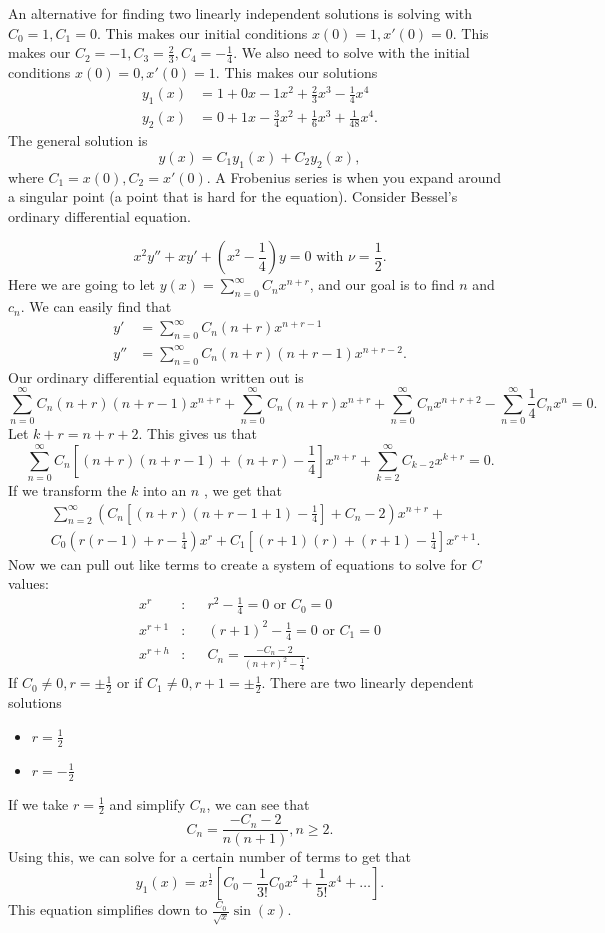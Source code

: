 An alternative for finding two linearly independent solutions is solving with $C_0=1,C_1=0$. This makes our initial conditions $x(0)=1,x'(0)=0$. This makes our $C_2=-1,C_3=\frac{2}{3},C_4=-\frac{1}{4}$. We also need to solve with the initial conditions $x(0)=0,x'(0)=1$. This makes our solutions 
\begin{align*}
  y_1(x)&=1+0x-1x^2+\frac{2}{3}x^3-\frac{1}{4}x^{4}\\
  y_2(x)&=0+1x-\frac{3}{4}x^2+\frac{1}{6}x^3+\frac{1}{48}x^{4}
.\end{align*}
The general solution is 
\[
  y(x)=C_1y_1(x)+C_2y_2(x)
,\] 
where $C_1=x(0),C_2=x'(0)$. A Frobenius series is when you expand around a singular point (a point that is hard for the equation). Consider Bessel's ordinary differential equation.
\begin{eg}
  \[
  x^2y''+xy'+\left( x^2-\frac{1}{4} \right) y=0\text{ with }\nu=\frac{1}{2}
  .\] 
  Here we are going to let $y(x)=\sum_{n=0}^{\infty} C_nx^{n+r}$, and our goal is to find $n$ and $c_n$. We can easily find that 
  \begin{align*}
    y'&=\sum_{n=0}^{\infty} C_n(n+r)x^{n+r-1}\\
    y''&=\sum_{n=0}^{\infty} C_n(n+r)(n+r-1)x^{n+r-2}
  .\end{align*}
  Our ordinary differential equation written out is 
  \[
    \sum_{n=0}^{\infty} C_n(n+r)(n+r-1)x^{n+r}+\sum_{n=0}^{\infty} C_n(n+r)x^{n+r}+\sum_{n=0}^{\infty} C_nx^{n+r+2}-\sum_{n=0}^{\infty} \frac{1}{4}C_nx^{n}=0
  .\] 
  Let $k+r=n+r+2$. This gives us that
  \[
    \sum_{n=0}^{\infty} C_n\left[ (n+r)(n+r-1)+(n+r)-\frac{1}{4} \right] x^{n+r}+\sum_{k=2}^{\infty} C_{k-2}x^{k+r}=0
  .\] 
  If we transform the $k$  into an $n$ , we get that 
  \begin{align*}
    &\sum_{n=2}^{\infty} \left( C_n\left[ (n+r)(n+r-1+1)-\frac{1}{4} \right] +C_n-2 \right) x^{n+r}+\\&C_0\left( r(r-1)+r-\frac{1}{4} \right) x^{r}+C_1\left[ (r+1)(r)+(r+1)-\frac{1}{4} \right] x^{r+1}
  .\end{align*}
  Now we can pull out like terms to create a system of equations to solve for $C$ values:
  \begin{align*}
    x^{r}&:&&r^2-\frac{1}{4}=0\text{ or }C_0=0\\
    x^{r+1}&:&&(r+1)^2-\frac{1}{4}=0\text{ or }C_1=0\\
    x^{r+h}&:&&C_n=\frac{-C_n-2}{(n+r)^2-\frac{1}{4}}
  .\end{align*}
  If $C_0\neq 0, r=\pm \frac{1}{2}$ or if $C_1\neq 0, r+1=\pm \frac{1}{2}$. There are two linearly dependent solutions
  \begin{itemize}
    \item $r=\frac{1}{2}$
    \item $r=-\frac{1}{2}$
  \end{itemize}
  If we take $r=\frac{1}{2}$ and simplify $C_n$, we can see that 
  \[
    C_n=\frac{-C_n-2}{n(n+1)}, n\ge 2
  .\] 
  Using this, we can solve for a certain number of terms to get that
  \[
    y_1(x)=x^{\frac{1}{2}}\left[ C_0-\frac{1}{3!}C_0x^2+\frac{1}{5!}x^{4}+\ldots \right] 
  .\] 
  This equation simplifies down to 
  $\frac{C_0}{\sqrt{x} }\sin (x)$.
\end{eg}
